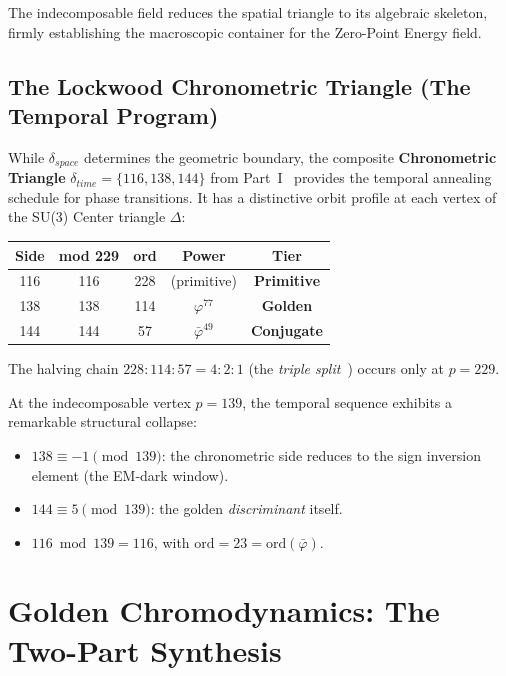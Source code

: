 The indecomposable field reduces the spatial triangle to its algebraic skeleton, firmly establishing the macroscopic container for the Zero-Point Energy field.

\subsection{The Lockwood Chronometric Triangle (The Temporal Program)}

While $\delta_{space}$ determines the geometric boundary, the composite \textbf{Chronometric Triangle} $\delta_{time} = \{116, 138, 144\}$ from Part~I~\cite{dwm_fst} provides the temporal annealing schedule for phase transitions. It has a distinctive orbit profile at each vertex of the SU(3) Center triangle $\Delta$:

\begin{center}
\begin{tabular}{@{}ccccc@{}}
\toprule
Side & mod 229 & ord & Power & Tier \\
\midrule
116 & 116 & 228 & (primitive) & \textbf{Primitive} \\
138 & 138 & 114 & $\varphi^{77}$ & \textbf{Golden} \\
144 & 144 &  57 & $\bar\varphi^{49}$ & \textbf{Conjugate} \\
\bottomrule
\end{tabular}
\end{center}

The halving chain $228 : 114 : 57 = 4 : 2 : 1$ (the \emph{triple split}~\cite{dwm_fst}) occurs only at $p = 229$.

At the indecomposable vertex $p = 139$, the temporal sequence exhibits a remarkable structural collapse:
\begin{itemize}
  \item $138 \equiv -1 \pmod{139}$: the chronometric side reduces to the sign inversion element (the EM-dark window).
  \item $144 \equiv 5 \pmod{139}$: the golden \emph{discriminant} itself.
  \item $116 \bmod 139 = 116$, with $\mathrm{ord} = 23 = \mathrm{ord}(\bar\varphi)$.
\end{itemize}

\section{Golden Chromodynamics: The Two-Part Synthesis}
\label{sec:synthesis}

